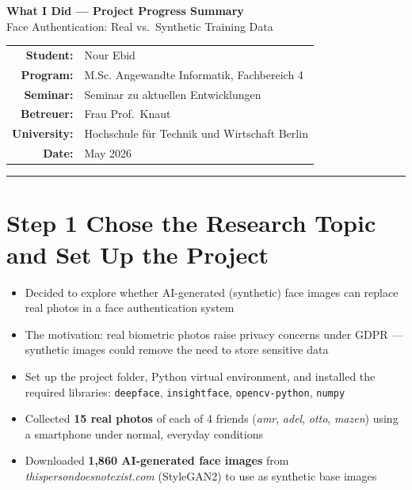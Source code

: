 \documentclass[11pt,a4paper]{article}
\begin{document}
\begin{center}
    {\LARGE\bfseries What I Did --- Project Progress Summary}\\[6pt]
    {\large Face Authentication: Real vs.\ Synthetic Training Data}\\[10pt]
    \begin{tabular}{rl}
        \textbf{Student:}   & Nour Ebid \\
        \textbf{Program:}   & M.Sc. Angewandte Informatik, Fachbereich 4 \\
        \textbf{Seminar:}   & Seminar zu aktuellen Entwicklungen \\
        \textbf{Betreuer:}  & Frau Prof.\ Knaut \\
        \textbf{University:}& Hochschule f{\"u}r Technik und Wirtschaft Berlin \\
        \textbf{Date:}      & May 2026 \\
    \end{tabular}
\end{center}

\vspace{8pt}
\hrule
\vspace{12pt}

\section*{Step 1 \quad Chose the Research Topic and Set Up the Project}

\begin{itemize}
    \item Decided to explore whether AI-generated (synthetic) face images can replace real photos in a face authentication system
    \item The motivation: real biometric photos raise privacy concerns under GDPR — synthetic images could remove the need to store sensitive data
    \item Set up the project folder, Python virtual environment, and installed the required libraries: \texttt{deepface}, \texttt{insightface}, \texttt{opencv-python}, \texttt{numpy}
    \item Collected \textbf{15 real photos} of each of 4 friends (\textit{amr}, \textit{adel}, \textit{otto}, \textit{mazen}) using a smartphone under normal, everyday conditions
    \item Downloaded \textbf{1,860 AI-generated face images} from \textit{thispersondoesnotexist.com} (StyleGAN2) to use as synthetic base images
\end{itemize}
\end{document}
